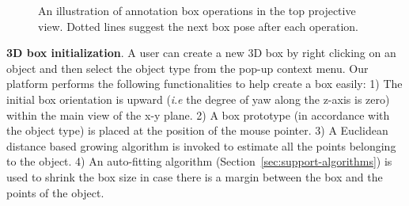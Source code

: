 \documentclass[letterpaper, 10 pt, conference]{ieeeconf}  %
\begin{document}
\begin{figure}[t]
	\centering
	\caption{An illustration of annotation box operations in the top projective view. Dotted lines suggest the next box pose after each operation.}
	\label{fig:box-mouse-edit-subview}
\end{figure}
\textbf{3D box initialization}. A user can create a new 3D box by right clicking on an object and then select the object type from the pop-up context menu. 
Our platform performs the following functionalities to help create a box easily:
1) The initial box orientation is upward (\textit{i}.\textit{e} the degree of yaw along the z-axis is zero) within the main view of the x-y plane.  
2) A box prototype (in accordance with the object type) is placed at the position of the mouse pointer.
3) A Euclidean distance based growing algorithm is invoked to estimate all the points belonging to the object.
4) An auto-fitting algorithm (Section~\ref{sec:support-algorithms}) is used to shrink the box size in case there is a margin between the box and the points of the object.
\end{document}
